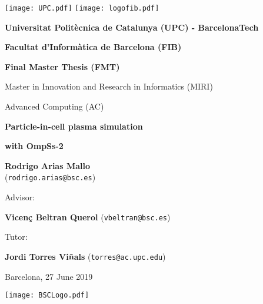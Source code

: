 
\thispagestyle{empty}

\begin{center}

\texttt{[image: UPC.pdf]}
\hspace{70mm}
\texttt{[image: logofib.pdf]}

\vspace{25mm}

{\bf\large Universitat Polit\`ecnica de Catalunya (UPC) - BarcelonaTech}
\par\vspace{1mm}
{\bf\large Facultat d'Inform\`atica de Barcelona (FIB)}
\par\vspace{1mm}
{\bf\large Final Master Thesis (FMT)}

\par\vspace{2mm}
{\large Master in Innovation and Research in Informatics (MIRI)}
\par\vspace{0.8mm}
{\large Advanced Computing (AC)}
\par\vspace{15mm}

{\bf\LARGE Particle-in-cell plasma simulation}\\
\par\vspace{0.8mm}
{\bf\LARGE with OmpSs-2}

\par\vspace{10mm}
{\bf\large Rodrigo Arias Mallo}\\
(\texttt{rodrigo.arias@bsc.es})

\vspace{10mm}

{\large Advisor:}\\
\par\vspace{1mm}
{\bf\large Vicen\c{c} Beltran Querol} (\texttt{vbeltran@bsc.es})\\
\par\vspace{3mm}
{\large Tutor:}\\
\par\vspace{1mm}
{\bf\large Jordi Torres Viñals} (\texttt{torres@ac.upc.edu}) \\
\par\vspace{4mm}

\vspace{10mm}

{\large Barcelona, 27 June 2019}

\vspace{10mm}

\begin{center}
 \texttt{[image: BSCLogo.pdf]}
\end{center}


\end{center}
\restoregeometry
